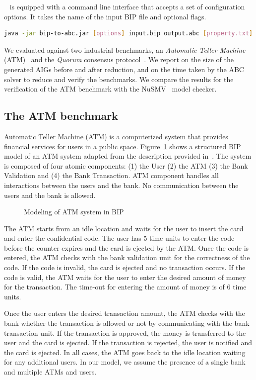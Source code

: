 \biptool~ is equipped with a command line interface that accepts a set 
of configuration options. 
It takes the name of the input BIP file and optional flags. 
\begin{lstlisting}[language=Bash]
java -jar bip-to-abc.jar [options] input.bip output.abc [property.txt]
\end{lstlisting}


We evaluated \biptool{} against two industrial benchmarks, 
an {\em Automatic Teller Machine} (ATM)~\cite{atm} and the {\em Quorum} consensus
protocol~\cite{guerraoui2012speculative}. We report on the size of the generated
AIGs before and after reduction, and on the time taken by the ABC solver to 
reduce and verify the benchmarks. We compare the results for the 
verification of the ATM benchmark with the NuSMV~\cite{nusmv} model checker.


\subsection{The ATM benchmark}
Automatic Teller Machine (ATM) is a computerized system that provides financial services for users in 
a public space. Figure~\ref{fig:atm_bip} shows a structured BIP model of an ATM system adapted from the
description provided in~\cite{atm}.
The system is composed of four atomic components: (1) the User (2) the ATM (3) the Bank Validation 
and (4) the Bank Transaction. ATM component handles all interactions between the 
users and the bank. No communication between the users and the bank is allowed. 

\begin{figure}[bt]
 \centering
  \resizebox{1.0\textwidth}{!}{
       
  }
  \caption{Modeling of ATM system in BIP} 
  \label{fig:atm_bip}
\end{figure}

The ATM starts from an idle location and waits for the user to insert the card 
and enter the confidential code. The user has $5$ time units
to enter the code before the counter expires and the card is ejected by the ATM. 
Once the code is entered, the ATM checks with the bank validation unit for 
the correctness of the code. If the code is invalid, the card is ejected
and no transaction occurs. If the code is valid, the ATM waits for the user to enter
the desired amount of money for the transaction. The time-out for entering the amount 
of money is of $6$ time units. 

Once the user enters the desired transaction amount, the ATM checks with the bank whether 
the transaction is allowed or not by communicating with the bank transaction unit.
If the transaction is approved, the money is transferred to the user and the card is ejected. 
If the transaction is rejected, the user is notified and the card is ejected. In all cases, 
the ATM goes back to the idle location waiting for any additional users. 
In our model, we assume the presence of a single bank and multiple ATMs and users. 

